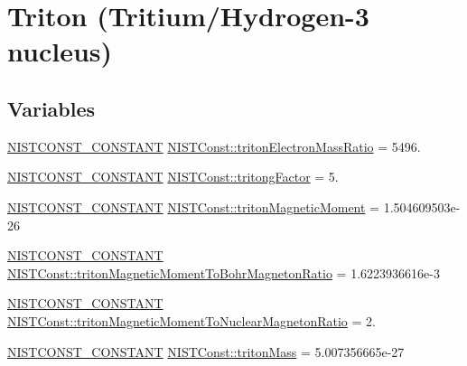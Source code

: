 \hypertarget{group___n_i_s_t_const-_triton}{}\section{Triton (Tritium/\+Hydrogen-\/3 nucleus)}
\label{group___n_i_s_t_const-_triton}
\subsection*{Variables}
\begin{DoxyCompactItemize}
\item 
\mbox{\hyperlink{_n_i_s_t_const_8hpp_a2b0fc1d7452373f816175dd86ce26729}{N\+I\+S\+T\+C\+O\+N\+S\+T\+\_\+\+C\+O\+N\+S\+T\+A\+NT}} \mbox{\hyperlink{group___n_i_s_t_const-_triton_gafedefaa51aee922ff69f0b4dbff11782}{N\+I\+S\+T\+Const\+::triton\+Electron\+Mass\+Ratio}} = 5496.
\item 
\mbox{\hyperlink{_n_i_s_t_const_8hpp_a2b0fc1d7452373f816175dd86ce26729}{N\+I\+S\+T\+C\+O\+N\+S\+T\+\_\+\+C\+O\+N\+S\+T\+A\+NT}} \mbox{\hyperlink{group___n_i_s_t_const-_triton_ga8d4de7b1320ae20c74556745c418b50d}{N\+I\+S\+T\+Const\+::tritong\+Factor}} = 5.
\item 
\mbox{\hyperlink{_n_i_s_t_const_8hpp_a2b0fc1d7452373f816175dd86ce26729}{N\+I\+S\+T\+C\+O\+N\+S\+T\+\_\+\+C\+O\+N\+S\+T\+A\+NT}} \mbox{\hyperlink{group___n_i_s_t_const-_triton_gac69c06d65c929c8d1f260b4555a1ca1d}{N\+I\+S\+T\+Const\+::triton\+Magnetic\+Moment}} = 1.\+504609503e-\/26
\item 
\mbox{\hyperlink{_n_i_s_t_const_8hpp_a2b0fc1d7452373f816175dd86ce26729}{N\+I\+S\+T\+C\+O\+N\+S\+T\+\_\+\+C\+O\+N\+S\+T\+A\+NT}} \mbox{\hyperlink{group___n_i_s_t_const-_triton_gab00d04d68fed57e67a5b92d04dcdcf93}{N\+I\+S\+T\+Const\+::triton\+Magnetic\+Moment\+To\+Bohr\+Magneton\+Ratio}} = 1.\+6223936616e-\/3
\item 
\mbox{\hyperlink{_n_i_s_t_const_8hpp_a2b0fc1d7452373f816175dd86ce26729}{N\+I\+S\+T\+C\+O\+N\+S\+T\+\_\+\+C\+O\+N\+S\+T\+A\+NT}} \mbox{\hyperlink{group___n_i_s_t_const-_triton_ga84a5453f454af22973152f1be7816ebe}{N\+I\+S\+T\+Const\+::triton\+Magnetic\+Moment\+To\+Nuclear\+Magneton\+Ratio}} = 2.
\item 
\mbox{\hyperlink{_n_i_s_t_const_8hpp_a2b0fc1d7452373f816175dd86ce26729}{N\+I\+S\+T\+C\+O\+N\+S\+T\+\_\+\+C\+O\+N\+S\+T\+A\+NT}} \mbox{\hyperlink{group___n_i_s_t_const-_triton_ga42de75cc7f68dc31060afe68471d2eba}{N\+I\+S\+T\+Const\+::triton\+Mass}} = 5.\+007356665e-\/27

\end{DoxyCompactItemize}
